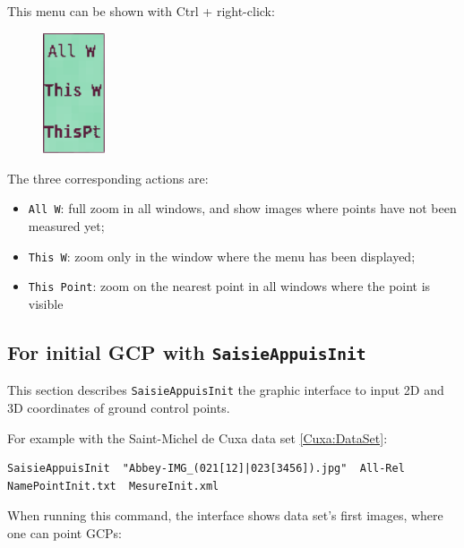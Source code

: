 This menu can be shown with Ctrl + right-click:

\begin{figure}[H]
\begin{center}
\includegraphics[width=52pt]{FIGS/Saisie/zoom.png}
\end{center}
\label{FIG:zoom}
\end{figure}

The three corresponding actions are:

\begin{itemize}
\item {\tt All W}: full zoom in all windows, and show images where points have not been measured yet;
\item {\tt This W}: zoom only in the window where the menu has been displayed;
\item {\tt This Point}: zoom on the nearest point in all windows where the point is visible
\end{itemize}


\subsection{For initial GCP  with {\tt SaisieAppuisInit}}
\label{SaisieAppuisInit}

This section describes {\tt SaisieAppuisInit} the graphic interface to input 2D and 3D coordinates of ground control points.

For example with the Saint-Michel de Cuxa data set \ref{Cuxa:DataSet}:

\begin{verbatim}
SaisieAppuisInit  "Abbey-IMG_(021[12]|023[3456]).jpg"  All-Rel  NamePointInit.txt  MesureInit.xml
\end{verbatim}

When running this command, the interface shows data set's first images, where one can point GCPs:

